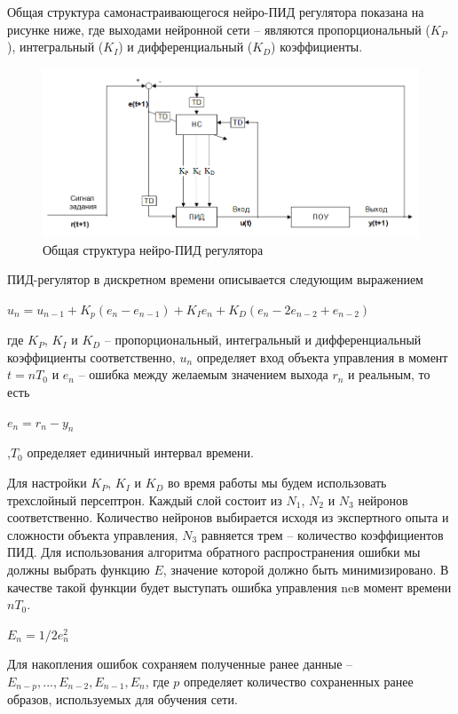 Общая структура самонастраивающегося  нейро-ПИД  регулятора  показана  на  рисунке ниже, где выходами нейронной сети – являются пропорциональный ($K_P$), интегральный ($K_I$) и дифференциальный ($K_D$) коэффициенты.

\begin{figure}[H]
	\includegraphics[scale=0.8]{images/part7/chapter_enterprise/neuropid.png}
	\caption{Общая структура  нейро-ПИД  регулятора}
	\label{fig:neuropid}
\end{figure}


ПИД-регулятор в дискретном времени описывается следующим выражением

$u_n = u_{n-1} + K_p (e_n - e_{n-1}) + K_I e_n + K_D (e_n - 2e_{n-2}+ e_{n-2} )$

где $K_P$, $K_I$ и $K_D$ – пропорциональный, интегральный и дифференциальный коэффициенты соответственно, $u_n$ определяет вход объекта управления в момент $t = nT_0$ и $e_n$ – ошибка между желаемым значением выхода $r_n$ и реальным, то есть 

$e_n = r_n - y_n $

,$T_0$ определяет единичный интервал времени. 

Для настройки $K_P$, $K_I$ и $K_D$ во время работы мы будем использовать  трехслойный  персептрон.  Каждый  слой  состоит  из $N_1$, $N_2$ и $N_3$ нейронов соответственно. Количество нейронов выбирается  исходя  из  экспертного  опыта  и  сложности  объекта  управления, $N_3$ равняется трем – количество коэффициентов ПИД. Для использования алгоритма обратного распространения ошибки мы должны выбрать функцию $E$, значение которой должно быть минимизировано. В качестве такой функции будет выступать ошибка управления neв момент времени $nT_0$.

$E_n = 1/2 e^2_n$ 

Для накопления ошибок сохраняем полученные ранее данные – $E_{n-p}, ..., E_{n-2},E_{n-1},E_n$,  где $p$  определяет  количество  сохраненных ранее образов, используемых для обучения сети.




